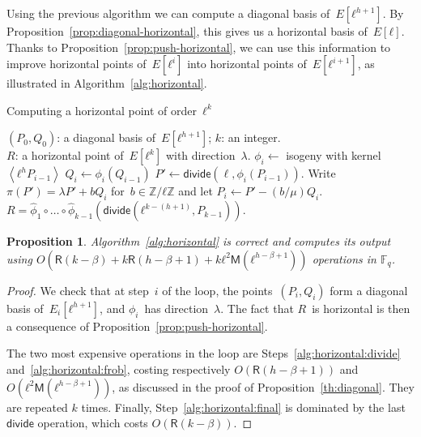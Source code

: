 \documentclass{lms}
\newtheorem{prop}[thm]{Proposition}
\def\chev#1{\left\langle#1\right\rangle}
\def\cout#1{\mathsf{#1}}
\def\sfdiv{\mathsf{divide}}
\newcommand{\F}{\mathbb{F}}
\newcommand{\MM}{\cout{M}}
\newcommand{\RR}{\cout{R}}
\begin{document}

Using the previous algorithm
we can compute a diagonal basis of~$E[ℓ^{h+1}]$.
By Proposition~\ref{prop:diagonal-horizontal},
this gives us a horizontal basis of~$E[ℓ]$.
Thanks to Proposition~\ref{prop:push-horizontal},
we can use this information to improve horizontal points of~$E[ℓ^i]$
into horizontal points of~$E[ℓ^{i+1}]$, as illustrated in
Algorithm~\ref{alg:horizontal}.

\begin{algorithm}
\caption{\label{alg:horizontal}Computing a horizontal point of order~$ℓ^k$}
\begin{algorithmic}[1]
\REQUIRE $(P_0, Q_0)$: a diagonal basis of~$E[ℓ^{h+1}]$; $k$: an integer.\\
\ENSURE $R$: a horizontal point of~$E[ℓ^k]$ with direction~$λ$.
\STATE $ϕ_i \gets $ isogeny with kernel~$\chev{ℓ^{h} P_{i-1}}$
\STATE $Q_{i} \gets ϕ_i(Q_{i-1})$
\STATE\label{alg:horizontal:divide} $P' \gets \sfdiv(\ell, ϕ_i(P_{i-1}))$.
\STATE\label{alg:horizontal:frob} Write~$π(P') = λ P' + b Q_i$ for~$b ∈ ℤ/ℓℤ$ and
let $P_{i} \gets P' - (b/μ) Q_i$.
\ENDFOR
\RETURN\label{alg:horizontal:final} $R = \widehat{ϕ}_1 ∘ … ∘ \widehat{ϕ}_{k-1}
  (\sfdiv( ℓ^{k-(h+1)}, P_{k-1}) )$. 
\end{algorithmic}
\end{algorithm}
\begin{prop}\label{th:horizontal}
  Algorithm~\ref{alg:horizontal} is correct and computes its output
  using $O(\RR(k-\beta) + k\RR(h-β+1) + kℓ^2\MM(ℓ^{h-β+1}))$
  operations in $\F_q$.
\end{prop}
\begin{proof}
We check that at step~$i$ of the loop,
the points~$(P_i, Q_i)$ form a diagonal basis of~$E_i[ℓ^{h+1}]$,
and $ϕ_i$~has direction~$λ$.
The fact that $R$~is horizontal is then a consequence
of Proposition~\ref{prop:push-horizontal}.

The two most expensive operations in the loop are
Steps~\ref{alg:horizontal:divide} and~\ref{alg:horizontal:frob},
costing respectively $O(\RR(h-β+1))$ and $O(ℓ^2\MM(ℓ^{h-β+1}))$, as
discussed in the proof of Proposition~\ref{th:diagonal}. They are
repeated $k$ times. Finally, Step~\ref{alg:horizontal:final} is
dominated by the last $\sfdiv$ operation, which costs $O(\RR(k-β))$.
\end{proof}
\end{document}
